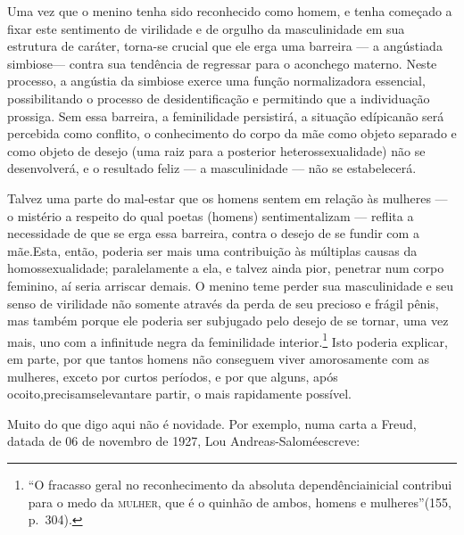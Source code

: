 Uma vez que o menino tenha sido reconhecido como homem, e tenha
começado a fixar este sentimento de virilidade e de orgulho da
masculinidade em sua estrutura de caráter, torna-se crucial que ele
erga uma barreira --- a angústia\idxangushom[|(] da simbiose\idxhomossimb[|(] --- contra sua tendência
de regressar para o aconchego materno.\idxconfeangu{} Neste processo, a angústia da
simbiose exerce uma função normalizadora essencial, possibilitando o
processo de desidentificação e permitindo que a individuação prossiga.
Sem essa barreira, a feminilidade persistirá, a situação edípica\idxconfe[|(] não
será percebida como conflito, o conhecimento do corpo da mãe como
objeto separado e como objeto de desejo (uma raiz para a posterior
heterossexualidade) não se desenvolverá, e o resultado feliz --- a
masculinidade --- não se estabelecerá.

Talvez uma parte do mal-estar que os homens sentem em relação às
mulheres --- o mistério a respeito do qual poetas (homens)
sentimentalizam --- reflita a necessidade de que se erga essa
barreira, contra o desejo de se fundir com a mãe.\idxmascupap[|)] Esta, então, poderia
ser mais uma contribuição às múltiplas causas da homossexualidade;
paralelamente a ela, e talvez ainda pior, penetrar num corpo feminino,
aí seria arriscar demais. O menino teme perder sua masculinidade e seu
senso de virilidade não somente através da perda de seu precioso e
frágil pênis, mas também porque ele poderia ser subjugado pelo desejo
de se tornar, uma vez mais, uno com a infinitude negra da feminilidade
interior.\footnote{ ``O fracasso geral no reconhecimento
da absoluta dependência\idxangushom[|nn] inicial contribui para o medo da \textsc{mulher}, que é
o quinhão de ambos, homens e mulheres''\idxhomossimb[|nn] (155, p.~304).}
Isto poderia explicar, em parte, por que tantos homens não conseguem
viver amorosamente com as mulheres, exceto por curtos períodos, e por
que alguns, após o\idxmascsu[|)] coito,\idxangusimb[|)] precisam\idxangushom[|)] se\idxmaesmasc[|)] levantar\idxhomossimb[|)] e partir, o mais
rapidamente possível.\idxangus[|)]

Muito do que digo aqui não é novidade. Por exemplo, numa carta a
Freud, datada de 06 de novembro de 1927, Lou Andreas-Salomé\idxsalome[|(] escreve:

